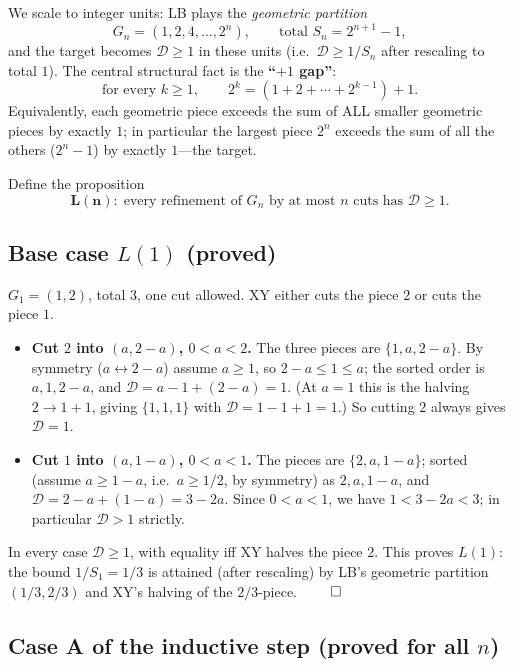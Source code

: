 \documentclass[11pt]{article}
\theoremstyle{definition}
\newcommand{\D}{\mathcal{D}}
\begin{document}
We scale to integer units: LB plays the \emph{geometric partition}
\[
G_n=(1,2,4,\dots,2^n),\qquad\text{total }S_n=2^{n+1}-1,
\]
and the target becomes $\D\ge 1$ in these units (i.e.\ $\D\ge 1/S_n$ after
rescaling to total $1$). The central structural fact is the
\textbf{``$+1$ gap''}:
\begin{equation}\label{eq:plusone}
\text{for every }k\ge 1,\qquad 2^k=(1+2+\cdots+2^{k-1})+1. \tag{$\dagger$}
\end{equation}
Equivalently, each geometric piece exceeds the sum of ALL smaller geometric
pieces by exactly $1$; in particular the largest piece $2^n$ exceeds the sum of
all the others ($2^n-1$) by exactly $1$---the target.

Define the proposition
\[
\mathbf{L(n)}:\;\text{every refinement of }G_n\text{ by at most }n\text{ cuts has }\D\ge 1.
\]

\subsection{Base case $L(1)$ (proved)}

$G_1=(1,2)$, total $3$, one cut allowed. XY either cuts the piece $2$ or cuts
the piece $1$.
\begin{itemize}[leftmargin=2em]
\item \textbf{Cut $2$ into $(a,2-a)$, $0<a<2$.} The three pieces are
$\{1,a,2-a\}$. By symmetry ($a\leftrightarrow 2-a$) assume $a\ge 1$, so
$2-a\le 1\le a$; the sorted order is $a,1,2-a$, and
$\D=a-1+(2-a)=1$. (At $a=1$ this is the halving $2\to 1+1$, giving
$\{1,1,1\}$ with $\D=1-1+1=1$.) So cutting $2$ always gives $\D=1$.
\item \textbf{Cut $1$ into $(a,1-a)$, $0<a<1$.} The pieces are
$\{2,a,1-a\}$; sorted (assume $a\ge 1-a$, i.e.\ $a\ge 1/2$, by symmetry) as
$2,a,1-a$, and $\D=2-a+(1-a)=3-2a$. Since $0<a<1$, we have
$1<3-2a<3$; in particular $\D>1$ strictly.
\end{itemize}
In every case $\D\ge 1$, with equality iff XY halves the piece $2$. This proves
$L(1)$: the bound $1/S_1=1/3$ is attained (after rescaling) by LB's geometric
partition $(1/3,2/3)$ and XY's halving of the $2/3$-piece. $\qed$

\subsection{Case A of the inductive step (proved for all $n$)}
\end{document}

